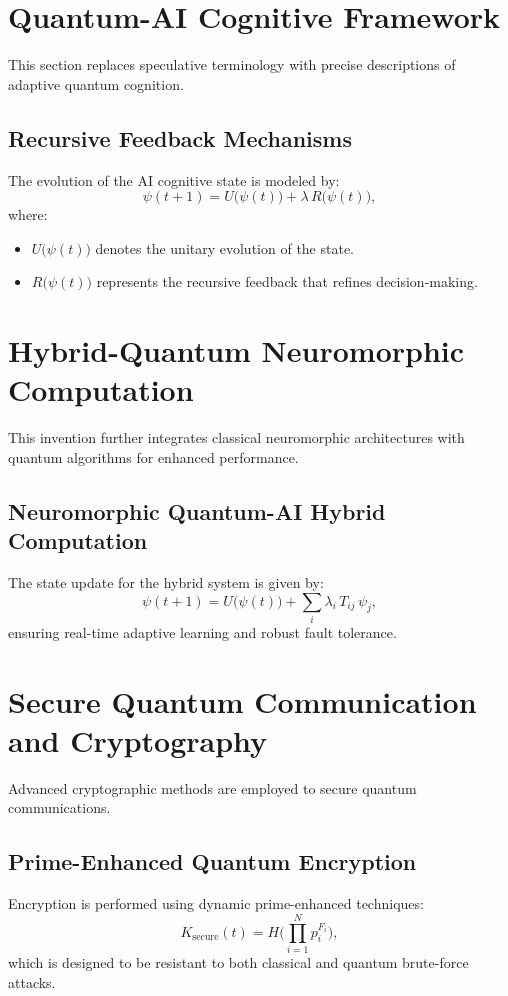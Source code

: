 \documentclass{article}
\theoremstyle{plain}
\begin{document}
\section{Quantum-AI Cognitive Framework}
This section replaces speculative terminology with precise descriptions of adaptive quantum cognition.

\subsection{Recursive Feedback Mechanisms}
The evolution of the AI cognitive state is modeled by:
\[
\psi(t+1) = U\bigl(\psi(t)\bigr) + \lambda\, R\bigl(\psi(t)\bigr),
\]
where:
\begin{itemize}
    \item $U\bigl(\psi(t)\bigr)$ denotes the unitary evolution of the state.
    \item $R\bigl(\psi(t)\bigr)$ represents the recursive feedback that refines decision-making.
\end{itemize}

\section{Hybrid-Quantum Neuromorphic Computation}
This invention further integrates classical neuromorphic architectures with quantum algorithms for enhanced performance.

\subsection{Neuromorphic Quantum-AI Hybrid Computation}
The state update for the hybrid system is given by:
\[
\psi(t+1) = U\bigl(\psi(t)\bigr) + \sum_{i} \lambda_i\, T_{ij}\, \psi_j,
\]
ensuring real-time adaptive learning and robust fault tolerance.

\section{Secure Quantum Communication and Cryptography}
Advanced cryptographic methods are employed to secure quantum communications.

\subsection{Prime-Enhanced Quantum Encryption}
Encryption is performed using dynamic prime-enhanced techniques:
\[
K_{\text{secure}}(t) = H\!\Biggl(\prod_{i=1}^{N} p_i^{F_i}\Biggr),
\]
which is designed to be resistant to both classical and quantum brute-force attacks.
\end{document}
